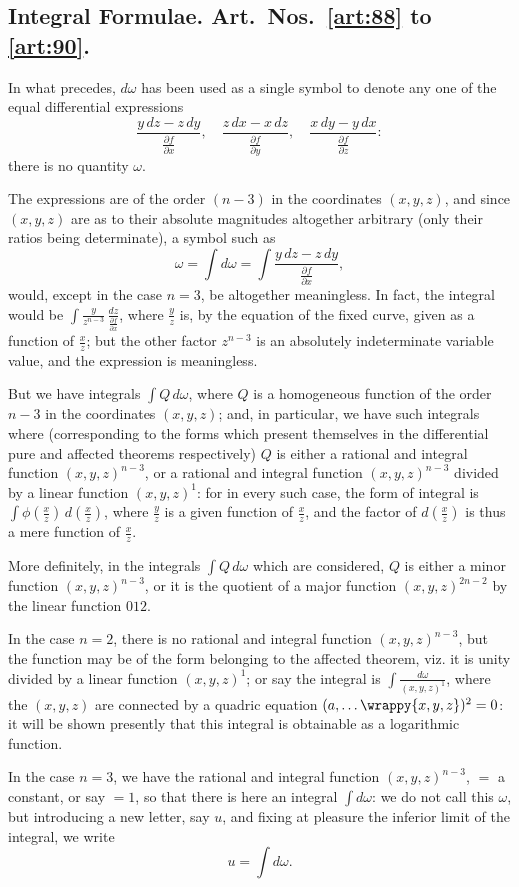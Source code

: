 \documentclass[11pt,a4paper]{book}
\begin{document}
\subsection*{Integral Formulae. Art.~Nos.~\ref{art:88} to \ref{art:90}.}

\begin{art}\label{art:88}
In what precedes, $d\omega$ has been used as a single symbol to denote any one of the equal differential expressions
\[
\frac{y\,dz - z\,dy}{\frac{\partial f}{\partial x}},\quad \frac{z\,dx - x\,dz}{\frac{\partial f}{\partial y}},\quad \frac{x\,dy - y\,dx}{\frac{\partial f}{\partial z}}:
\]
there is no quantity $\omega$.

The expressions are of the order $(n - 3)$ in the coordinates $(x, y, z)$, and since $(x, y, z)$ are as to their absolute magnitudes altogether arbitrary (only their ratios being determinate), a symbol such as
\[
\omega = \int d\omega = \int \frac{y\,dz - z\,dy}{\frac{\partial f}{\partial x}},
\]
would, except in the case $n = 3$, be altogether meaningless. In fact, the integral would be $\int \frac{y}{z^{n-3}}\,\frac{dz}{\frac{\partial f}{\partial x}}$, where $\frac{y}{z}$ is, by the equation of the fixed curve, given as a function of $\frac{x}{z}$; but the other factor $z^{n-3}$ is an absolutely indeterminate variable value, and the expression is meaningless.

But we have integrals $\int Q\,d\omega$, where $Q$ is a homogeneous function of the order $n - 3$ in the coordinates $(x, y, z)$; and, in particular, we have such integrals where (corresponding to the forms which present themselves in the differential pure and affected theorems respectively) $Q$ is either a rational and integral function $(x, y, z)^{n-3}$, or a rational and integral function $(x, y, z)^{n-3}$ divided by a linear function $(x, y, z)^1$: for in every such case, the form of integral is $\int \phi\left(\frac{x}{z}\right)\,d\left(\frac{x}{z}\right)$, where $\frac{y}{z}$ is a given function of $\frac{x}{z}$, and the factor of $d\left(\frac{x}{z}\right)$ is thus a mere function of $\frac{x}{z}$.

More definitely, in the integrals $\int Q\,d\omega$ which are considered, $Q$ is either a minor function $(x, y, z)^{n-3}$, or it is the quotient of a major function $(x, y, z)^{2n-2}$ by the linear function $012$.

\newpage
In the case $n = 2$, there is no rational and integral function $(x, y, z)^{n-3}$, but the function may be of the form belonging to the affected theorem, viz. it is unity divided by a linear function $(x, y, z)^1$; or say the integral is $\int \frac{d\omega}{(x, y, z)^1}$, where the $(x, y, z)$ are connected by a quadric equation $(a, \ldots \wrappy{x, y, z})^2 = 0$: it will be shown presently that this integral is obtainable as a logarithmic function.

In the case $n = 3$, we have the rational and integral function $(x, y, z)^{n-3}$, $= $ a constant, or say $= 1$, so that there is here an integral $\int d\omega$: we do not call this $\omega$, but introducing a new letter, say $u$, and fixing at pleasure the inferior limit of the integral, we write
\[
u = \int d\omega.
\]
\end{art}
\end{document}
